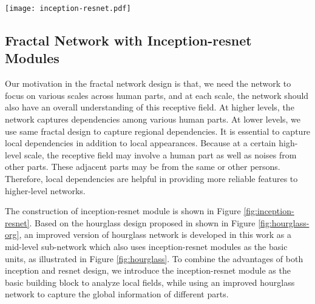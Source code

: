\documentclass[journal ]{IEEEtran}
\begin{document}
\begin{figure*}
	\begin{center}
		\texttt{[image: inception-resnet.pdf]}
	\end{center}
	\caption{\textbf{Basic module: Inception-resnet}. Convolution layers are padded such that the resolution of output is the same as that of the input. The benefit of this module is that the input and output are of uniform resolution while the depth of channels can be changed. The function of this basic module is to interpret the input information from one form to another, extracting features for another abstraction level with little loss of information quantity.}
	\label{fig:inception-resnet}
\end{figure*}


\subsection{Fractal Network with Inception-resnet Modules}
\label{sec:inception-resnet}

Our motivation in the fractal network design is that, we need the network to focus on various scales across human parts, and at each scale, the network should also have an overall understanding of this receptive field.
At higher levels, the network captures dependencies among various human parts. At lower levels, we use same fractal design to capture regional dependencies. It is essential to capture local dependencies in addition to local appearances. Because at a certain high-level scale, the receptive field may involve a human part as well as noises from other parts. These adjacent parts may be from the same or other persons. Therefore, local dependencies are helpful in providing more reliable features to higher-level networks.

The construction of inception-resnet module is shown in Figure \ref{fig:inception-resnet}. Based on the hourglass design proposed in \cite{newell2016stacked} shown in Figure \ref{fig:hourglass-org}, an improved version of hourglass network is developed in this work as a mid-level sub-network which also uses inception-resnet modules as the basic units, as illustrated in Figure \ref{fig:hourglass}.  
To combine the advantages of both inception and resnet design, we introduce the inception-resnet module as the basic building block to analyze local fields, while using an improved hourglass network to capture the global information of different parts. 
\end{document}
